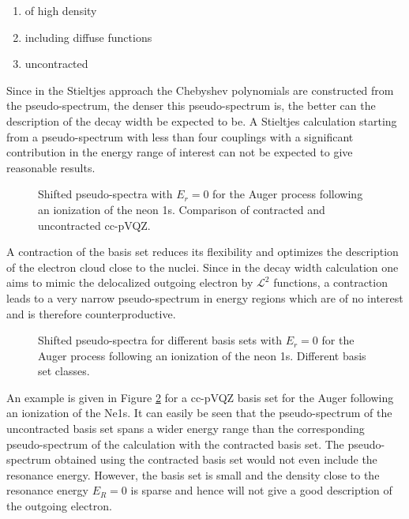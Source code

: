 \begin{enumerate}
 \item of high density
 \item including diffuse functions
 \item uncontracted
\end{enumerate}
Since in the Stieltjes approach the Chebyshev polynomials are constructed from
the pseudo-spectrum, the denser this pseudo-spectrum is, the better can the
description of the decay width be expected to be. A Stieltjes calculation starting
from a pseudo-spectrum with less than four couplings with a significant contribution
in the energy range of interest can not be expected to give reasonable results.

\begin{figure}[ht]
  \centering
  
  \caption{Shifted pseudo-spectra with $E_r=0$
           for the Auger process following an ionization of the neon 1s.
           Comparison of contracted and uncontracted cc-pVQZ.}
  \label{figure:bases_pseudospectra}
\end{figure}

A contraction of the basis set reduces its flexibility and optimizes the
description of the electron cloud close to the nuclei. Since in the decay width
calculation one aims to mimic the delocalized outgoing electron by
$\mathcal{L}^2$ functions, a contraction leads to a very narrow pseudo-spectrum
in energy regions which are of no interest and is therefore counterproductive.

\begin{figure}[ht]
  \centering
  
  \caption{Shifted pseudo-spectra for different basis sets with $E_r=0$
           for the Auger process following an ionization of the neon 1s.
           Different basis set classes.}
  \label{figure:bases_pseudospectra}
\end{figure}

An example is given in Figure \ref{figure:bases_pseudospectra} for a cc-pVQZ
basis set for the Auger following an ionization of the Ne1s.
It can easily be seen that the pseudo-spectrum of the uncontracted basis set spans
a wider energy range than the corresponding pseudo-spectrum of the calculation with
the contracted basis set. The pseudo-spectrum obtained using the contracted
basis set would not even include the resonance energy.
However, the basis set is small and the density close to the resonance energy
$E_R=0$ is sparse and hence will not give a good description of the outgoing
electron.


